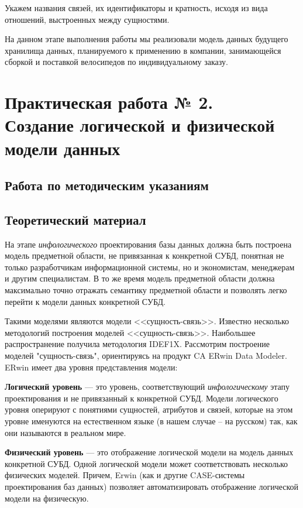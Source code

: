 \documentclass[a4paper,14pt]{extarticle}
\newcommand{\methodsection}{Работа по методическим указаниям}
\begin{document}
Укажем названия связей, их идентификаторы и кратность, исходя из вида отношений, выстроенных между сущностями.

На данном этапе выполнения работы мы реализовали модель данных будущего хранилища данных, планируемого к применению в компании, занимающейся сборкой и поставкой велосипедов по индивидуальному заказу.

\section{Практическая работа № 2. \\Создание логической и физической модели данных}
\subsection{\methodsection}
\subsection*{Теоретический материал}
На этапе \textit{инфологического} проектирования базы данных должна быть построена
модель предметной области, не привязанная к конкретной СУБД, понятная не только
разработчикам информационной системы, но и экономистам, менеджерам и другим
специалистам. В то же время модель предметной области должна максимально точно
отражать семантику предметной области и позволять легко перейти к модели данных
конкретной СУБД.

Такими моделями являются модели <<сущность-связь>>. Известно несколько
методологий построения моделей <<сущность-связь>>. Наибольшее распространение
получила методология IDEF1X. Рассмотрим построение моделей "сущность-связь",
ориентируясь на продукт CA ERwin Data Modeler. ERwin имеет два уровня
представления модели:

\textbf{Логический уровень} --- это уровень, соответствующий \textit{инфологическому} этапу проектирования
и не привязанный к конкретной СУБД. Модели логического уровня оперируют с
понятиями сущностей, атрибутов и связей, которые на этом уровне именуются на
естественном языке (в нашем случае – на русском) так, как они называются в
реальном мире.

\textbf{Физический уровень} --- это отображение логической модели на модель данных
конкретной СУБД. Одной логической модели может соответствовать несколько
физических моделей. Причем, Erwin (как и другие CASE-системы проектирования баз
данных) позволяет автоматизировать отображение логической модели на физическую.
\end{document}

